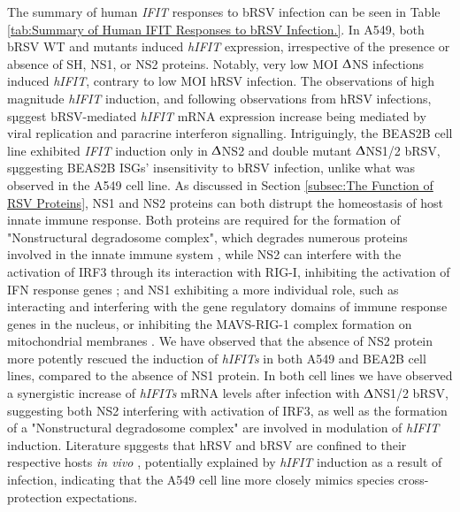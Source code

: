 The summary of human \textit{IFIT} responses to bRSV infection can be seen in Table \ref{tab:Summary of Human IFIT Responses to bRSV Infection.}. In A549, both bRSV WT and mutants induced \textit{hIFIT} expression, irrespective of the presence or absence of SH, NS1, or NS2 proteins. Notably, very low MOI $\Updelta$NS infections induced \textit{hIFIT}, contrary to low MOI hRSV infection. The observations of high magnitude \textit{hIFIT} induction, and following observations from hRSV infections, sµggest bRSV-mediated \textit{hIFIT} mRNA expression increase being mediated by viral replication and paracrine interferon signalling. Intriguingly, the BEAS2B cell line exhibited \textit{IFIT} induction only in $\Updelta$NS2 and double mutant $\Updelta$NS1/2 bRSV, sµggesting BEAS2B ISGs' insensitivity to bRSV infection, unlike what was observed in the A549 cell line. As discussed in Section \ref{subsec:The Function of RSV Proteins}, NS1 and NS2 proteins can both distrupt the homeostasis of host innate immune response. Both proteins are required for the formation of "Nonstructural degradosome complex", which degrades numerous proteins involved in the innate immune system \cite{Boyoglu-Barnum2019BiologyDevelopment.}, while NS2 can interfere with the activation of IRF3 through its interaction with RIG-I, inhibiting the activation of IFN response genes \cite{Wright2006TheHumans}; and NS1 exhibiting a more individual role, such as interacting and interfering with the gene regulatory domains of immune response genes in the nucleus, or inhibiting the MAVS-RIG-1 complex formation on mitochondrial membranes \cite{Sedeyn2019RespiratoryResponses, Spann2004SuppressionMacrophages}. We have observed that the absence of NS2 protein more potently rescued the induction of \textit{hIFITs} in both A549 and BEA2B cell lines, compared to the absence of NS1 protein. In both cell lines we have observed a synergistic increase of \textit{hIFITs} mRNA levels after infection with $\Updelta$NS1/2 bRSV, suggesting both NS2 interfering with activation of IRF3, as well as the formation of a "Nonstructural degradosome complex" are involved in modulation of \textit{hIFIT} induction. Literature sµggests that hRSV and bRSV are confined to their respective hosts \textit{in vivo} \cite{Buchholz2000ChimericVaccine}, potentially explained by \textit{hIFIT} induction as a result of infection, indicating that the A549 cell line more closely mimics species cross-protection expectations.

